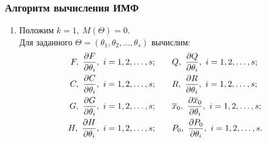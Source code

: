 \documentclass[a4paper,14pt]{extarticle}
\newcommand{\pd}[2]{\frac{\partial #1}{\partial #2}}
\begin{document}
\subsubsection{Алгоритм вычисления ИМФ}
\begin{enumerate}
	\item Положим $k = 1,\ M(\Theta) = 0$. \\
		Для заданного $\Theta = (\theta_1, \theta_2, \ldots, \theta_s)$ вычислим:
\begin{align*}
	F,\ \pd{F}{\theta_i},\ i=1,2,\ldots,s; \qquad &
	Q,\ \pd{Q}{\theta_i},\ i=1,2,\ldots,s; \\
	C,\ \pd{C}{\theta_i},\ i=1,2,\ldots,s; \qquad &
	R,\ \pd{R}{\theta_i},\ i=1,2,\ldots,s; \\
	G,\ \pd{G}{\theta_i},\ i=1,2,\ldots,s; \qquad &
	\ol{x}_0,\ \pd{\ol{x}_0}{\theta_i},\ i=1,2,\ldots,s; \\
	H,\ \pd{H}{\theta_i},\ i=1,2,\ldots,s; \qquad &
	P_0,\ \pd{P_0}{\theta_i},\ i=1,2,\ldots,s.
\end{align*}


\end{enumerate}
\end{document}

